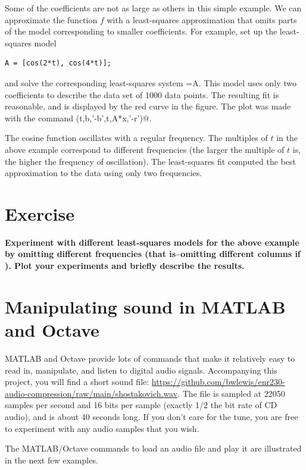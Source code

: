 \documentclass[10pt]{article}
\begin{document}
Some of the coefficients are not as large as others in this simple example.
We can approximate the function $f$ with a least-squares approximation that
omits parts of the model corresponding to smaller coefficients.
For example, set up the least-squares model
\begin{verbatim}
A = [cos(2*t), cos(4*t)];
\end{verbatim}
and solve the corresponding least-squares system 
{\verb@x=A\b@}. 
This model uses only two coefficients to describe the data set of 1000
data points. The resulting fit is reasonable, and is displayed by the red
curve in the figure. The plot was made with the command
{\verb@plot (t,b,'-b',t,A*x,'-r')@}.

The cosine function oscillates with a regular frequency. The multiples of
$t$ in the above example correspond to different frequencies (the larger
the multiple of $t$ is, the higher the frequency of oscillation). 
The least-squares
fit computed the best approximation to the data using only two 
frequencies. 

\section*{Exercise}

{\bf Experiment with different least-squares models for the above example by
omitting different frequencies (that is--omitting different columns if
\verb@A@). Plot your experiments and briefly describe the results.}



\section*{Manipulating sound in MATLAB and Octave}

MATLAB and Octave provide lots of commands that make it relatively easy to read
in, manipulate, and listen to digital audio signals.  Accompanying this
project, you will find a short sound file:
\url{https://github.com/bwlewis/enr230-audio-compression/raw/main/shostakovich.wav}.
The file is sampled at 22050 samples per second and 16 bits per sample (exactly
1/2 the bit rate of CD audio), and is about 40 seconds long.  If you don't care
for the tune, you are free to experiment with any audio samples that you wish. 

The MATLAB/Octave commands to load an audio file and play it are illustrated in
the next few examples.
\end{document}
